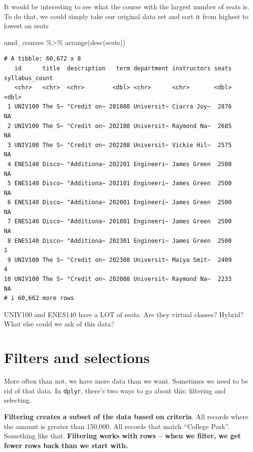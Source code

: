 \documentclass[
  letterpaper,
  DIV=11,
  numbers=noendperiod]{scrreprt}
\newenvironment{Shaded}{\begin{snugshade}}{\end{snugshade}}
\newcommand{\FunctionTok}[1]{\textcolor[rgb]{0.28,0.35,0.67}{#1}}
\newcommand{\NormalTok}[1]{\textcolor[rgb]{0.00,0.23,0.31}{#1}}
\newcommand{\SpecialCharTok}[1]{\textcolor[rgb]{0.37,0.37,0.37}{#1}}
\begin{document}
It would be interesting to see what the course with the largest number
of seats is. To do that, we could simply take our original data set and
sort it from highest to lowest on seats

\begin{Shaded}
\begin{Highlighting}[]
\NormalTok{umd\_courses }\SpecialCharTok{\%\textgreater{}\%}
  \FunctionTok{arrange}\NormalTok{(}\FunctionTok{desc}\NormalTok{(seats))}
\end{Highlighting}
\end{Shaded}

\begin{verbatim}
# A tibble: 60,672 x 8
   id      title  description   term department instructors seats syllabus_count
   <chr>   <chr>  <chr>        <dbl> <chr>      <chr>       <dbl>          <dbl>
 1 UNIV100 The S~ "Credit on~ 201808 Universit~ Ciarra Joy~  2876             NA
 2 UNIV100 The S~ "Credit on~ 202108 Universit~ Raymond Na~  2685             NA
 3 UNIV100 The S~ "Credit on~ 202208 Universit~ Vickie Hil~  2575             NA
 4 ENES140 Disco~ "Additiona~ 202201 Engineeri~ James Green  2500             NA
 5 ENES140 Disco~ "Additiona~ 202101 Engineeri~ James Green  2500             NA
 6 ENES140 Disco~ "Additiona~ 202001 Engineeri~ James Green  2500             NA
 7 ENES140 Disco~ "Additiona~ 201801 Engineeri~ James Green  2500             NA
 8 ENES140 Disco~ "Additiona~ 202301 Engineeri~ James Green  2500              1
 9 UNIV100 The S~ "Credit on~ 202308 Universit~ Maiya Smit~  2409              4
10 UNIV100 The S~ "Credit on~ 202008 Universit~ Raymond Na~  2233             NA
# i 60,662 more rows
\end{verbatim}

UNIV100 and ENES140 have a LOT of seats. Are they virtual classes?
Hybrid? What else could we ask of this data?


\hypertarget{filters-and-selections}{%
\chapter{Filters and selections}\label{filters-and-selections}}

More often than not, we have more data than we want. Sometimes we need
to be rid of that data. In \texttt{dplyr}, there's two ways to go about
this: filtering and selecting.

\textbf{Filtering creates a subset of the data based on criteria}. All
records where the amount is greater than 150,000. All records that match
``College Park''. Something like that. \textbf{Filtering works with rows
-- when we filter, we get fewer rows back than we start with.}
\end{document}
